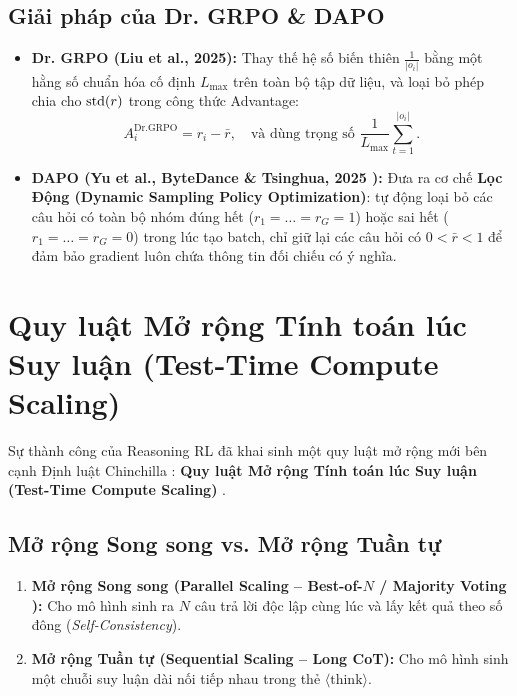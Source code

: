 \subsection{Giải pháp của Dr. GRPO \citep{liu2025understanding} \& DAPO \citep{yu2025dapo}}
\begin{itemize}[leftmargin=1.2cm]
    \item \textbf{Dr. GRPO (Liu et al., 2025):} Thay thế hệ số biến thiên $\frac{1}{|o_i|}$ bằng một hằng số chuẩn hóa cố định $L_{\max}$ trên toàn bộ tập dữ liệu, và loại bỏ phép chia cho $\operatorname{\mathrm{std}}(r)$ trong công thức Advantage:
    \begin{equation}
        A_i^{\text{Dr.GRPO}} = r_i - \bar{r}, \quad \text{và dùng trọng số } \frac{1}{L_{\max}} \sum_{t=1}^{|o_i|}.
    \end{equation}
    \item \textbf{DAPO (Yu et al., ByteDance \& Tsinghua, 2025 \citealt{yu2025dapo}):} Đưa ra cơ chế \textbf{Lọc Động (Dynamic Sampling Policy Optimization)}: tự động loại bỏ các câu hỏi có toàn bộ nhóm đúng hết ($r_1=\dots=r_G=1$) hoặc sai hết ($r_1=\dots=r_G=0$) trong lúc tạo batch, chỉ giữ lại các câu hỏi có $0 < \bar{r} < 1$ để đảm bảo gradient luôn chứa thông tin đối chiếu có ý nghĩa.
\end{itemize}

\section{Quy luật Mở rộng Tính toán lúc Suy luận (Test-Time Compute Scaling)}
\label{sec:test_time_compute}

Sự thành công của Reasoning RL đã khai sinh một quy luật mở rộng mới bên cạnh Định luật Chinchilla \citep{hoffmann2022training}: \textbf{Quy luật Mở rộng Tính toán lúc Suy luận (Test-Time Compute Scaling)} \citep{snell2024scaling, brown2024large}.

\subsection{Mở rộng Song song vs. Mở rộng Tuần tự}
\begin{enumerate}[leftmargin=1.2cm]
    \item \textbf{Mở rộng Song song (Parallel Scaling -- Best-of-$N$ / Majority Voting \citealt{wang2023self}):} Cho mô hình sinh ra $N$ câu trả lời độc lập cùng lúc và lấy kết quả theo số đông (\textit{Self-Consistency}).
    \item \textbf{Mở rộng Tuần tự (Sequential Scaling -- Long CoT):} Cho mô hình sinh một chuỗi suy luận dài nối tiếp nhau trong thẻ $\langle\text{think}\rangle$.
\end{enumerate}

